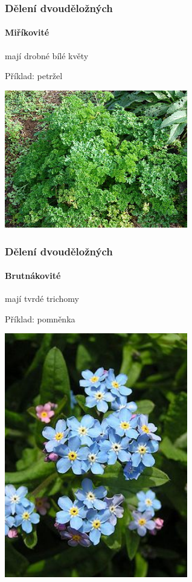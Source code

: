 \documentclass{beamer}
\begin{document}
\begin{frame}
\frametitle{Dělení dvouděložných}
	\framesubtitle{Miříkovité}mají drobné bílé květy

Příklad: petržel

\begin{center}\includegraphics[width=8cm]{330px-Starr_070112-3391_Petroselinum_crispum.jpg}\end{center}
\end{frame}



\begin{frame}
\frametitle{Dělení dvouděložných}
	\framesubtitle{Brutnákovité}mají tvrdé trichomy

Příklad: pomněnka

\begin{center}\includegraphics[width=8cm]{258px-Forget-me-not_close_600.jpg}\end{center}
\end{frame}
\end{document}
